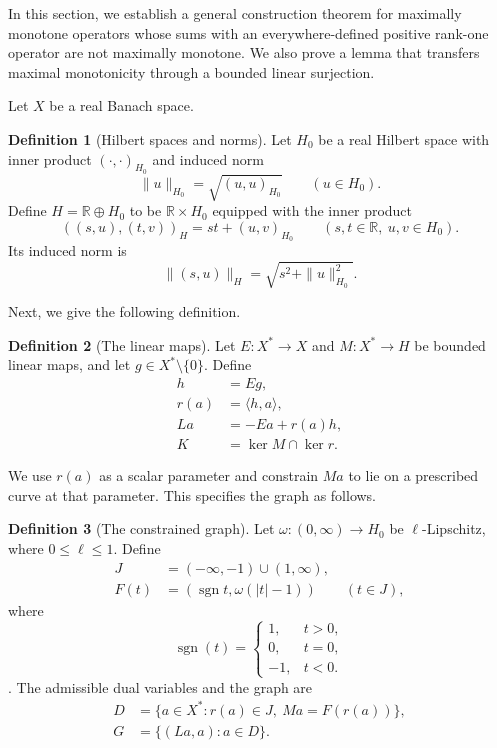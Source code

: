\documentclass[11pt]{article}
\newcommand{\R}{\mathbb R}
\newcommand{\sgn}{\operatorname{sgn}}
\newcommand{\pair}[2]{\langle #1,#2\rangle}
\theoremstyle{definition}
\newtheorem{definition}{Definition}
\theoremstyle{remark}
\begin{document}
In this section, we establish a general construction theorem for maximally monotone operators whose sums with an everywhere-defined positive rank-one operator are not maximally monotone. We also prove a lemma that transfers maximal monotonicity through a bounded linear surjection.





Let $X$ be a real Banach space.
\begin{definition}[Hilbert spaces and norms]
\label{def:hilbert-spaces-norms}
Let $H_0$ be a real Hilbert space with inner product $(\cdot,\cdot)_{H_0}$ and induced norm
\[
\|u\|_{H_0}=\sqrt{(u,u)_{H_0}}\qquad(u\in H_0).
\]
Define $H=\R\oplus H_0$ to be $\R\times H_0$ equipped with the inner product
\[
((s,u),(t,v))_H=st+(u,v)_{H_0}
\qquad(s,t\in\R,\ u,v\in H_0).
\]
Its induced norm is
\[
\|(s,u)\|_H=\sqrt{s^2+\|u\|_{H_0}^2}.
\]
\end{definition}
Next, we give the following definition.

\begin{definition}[The linear maps]
\label{def:construction-maps}
Let $E:X^*\to X$ and $M:X^*\to H$ be bounded linear maps, and let $g\in X^*\setminus\{0\}$. Define
\[
\begin{aligned}
h&=Eg,\\
r(a)&=\pair{h}{a},\\
La&=-Ea+r(a)h,\\
K&=\ker M\cap\ker r.
\end{aligned}
\]
\end{definition}

We use $r(a)$ as a scalar parameter and constrain $Ma$ to lie on a prescribed curve at that parameter. This specifies the graph as follows.

\begin{definition}[The constrained graph]
\label{def:construction-graph}
Let $\omega:(0,\infty)\to H_0$ be $\ell$-Lipschitz, where $0\le\ell\le1$. Define
\[
\begin{aligned}
J&=(-\infty,-1)\cup(1,\infty),\\
F(t)&=(\sgn t,\omega(|t|-1))\qquad(t\in J), 
\end{aligned}
\]
where \[
\operatorname{sgn}(t)=
\begin{cases}
1, & t>0,\\
0, & t=0,\\
-1, & t<0.
\end{cases}
\]. 
The admissible dual variables and the graph are
\begin{equation}
\begin{aligned}
D&=\{a\in X^*:r(a)\in J,\ Ma=F(r(a))\},\\
G&=\{(La,a):a\in D\}.
\end{aligned}
\label{eq:abs-full-graph}
\end{equation}
\end{definition}
\end{document}
